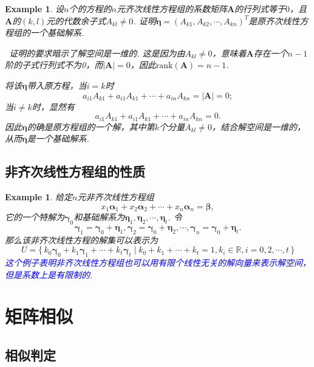 \documentclass{article}
\newtheorem{example}[theorem]{Example}
\newcommand\Set[2]{\{\,#1\mid#2\,\}} %
\newcommand{\hints}{{\color{blue} \text{hints}}}
\newcommand{\mbf}[1]{\bm{#1}}
\newcommand{\rank}[1]{\text{rank}\left(#1\right)} %
\newcommand{\bluet}[1]{\textcolor{blue}{#1}}
\begin{document}
\begin{example}
\rm 设$n$个的方程的$n$元齐次线性方程组的系数矩阵$\mbf{A}$的行列式等于$0$，且$\mbf{A}$的$(k,l)$元的代数余子式$A_{kl} \neq 0$. 证明$\mbf{\eta}=(A_{k1},A_{k2},\cdots,A_{kn})^T$是原齐次线性方程组的一个基础解系. 

\hints\ 证明的要求暗示了解空间是一维的. 这是因为由$A_{kl} \neq 0$，意味着$\mbf{A}$存在一个$n-1$阶的子式行列式不为0，而$|\mbf{A}| = 0$，因此$\rank{\mbf{A}} = n-1$. 

将该$\mbf{\eta}$带入原方程，当$i = k$时
$$
a_{i1}A_{k1} + a_{i1}A_{k1} +\cdots +a_{in}A_{kn} = |\mbf{A}| = 0; 
$$
当$i \neq k$时，显然有
$$
a_{i1}A_{k1} + a_{i1}A_{k1} +\cdots +a_{in}A_{kn} = 0.
$$
因此$\mbf{\eta}$的确是原方程组的一个解，其中第$k$个分量$A_{kl} \neq 0$，结合解空间是一维的，从而$\mbf{\eta}$是一个基础解系. 
\end{example}

\subsection{非齐次线性方程组的性质}

\begin{example}
\rm 给定$n$元非齐次线性方程组
$$
x_1\mbf{\alpha}_1 + x_2\mbf{\alpha}_2 + \cdots + x_n\mbf{\alpha}_n = \mbf{\beta},
$$
它的一个特解为$\mbf{\gamma}_0$和基础解系为$\mbf{\eta}_1,\mbf{\eta}_2,\cdots,\mbf{\eta}_t$. 令
$$
\mbf{\gamma}_1 = \mbf{\gamma}_0 + \mbf{\eta}_1, \mbf{\gamma}_2 = \mbf{\gamma}_0 + \mbf{\eta}_2,\cdots,\mbf{\gamma}_n = \mbf{\gamma}_0 + \mbf{\eta}_t.
$$
那么该非齐次线性方程的解集可以表示为
$$
U = \Set{k_0\mbf{\gamma}_0+k_1\mbf{\gamma}_1+\cdots+k_t\mbf{\gamma}_t}{k_0 + k_1 + \cdots + k_t = 1, k_i \in \mathbb{R},i =0,2,\cdots,t}
$$
\bluet{这个例子表明非齐次线性方程组也可以用有限个线性无关的解向量来表示解空间，但是系数上是有限制的}.
\end{example}

\newpage
\section{矩阵相似}

\subsection{相似判定}
\end{document}
